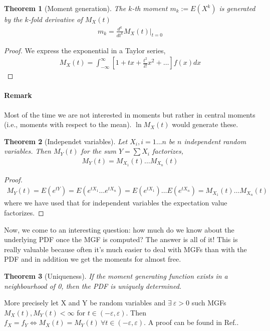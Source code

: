 \documentclass[10pt,a4paper]{article}
\newtheorem{theorem}{Theorem}
\begin{document}
\begin{theorem}[Moment generation]
The $k$-th moment $m_k:=E(X^k)$ is generated by the $k$-fold derivative of $M_X(t)$
\begin{align}
m_k = \frac{d^k}{dt^k} M_X(t)  \bigg \rvert_{t=0}
\end{align}
\end{theorem}
\begin{proof}
We express the exponential in a Taylor series,
\begin{align}
M_X(t) = \int_{-\infty}^{\infty} \left[ 1+ tx + \frac{t^2}{2!}x^2 + \dots   \right] f(x) dx 
\end{align}
\end{proof}

\paragraph*{Remark} Most of the time we are not interested in moments but rather in central moments (i.e., moments with respect to the mean). $\ln M_X(t)$ would generate these.

\begin{theorem}[Independet variables] Let $X_i, i=1\dots n$ be $n$ independent random variables. Then $M_Y(t)$ for the sum $Y = \sum X_i$ factorizes,
\begin{align}
M_Y(t) = M_{X_1}(t) \dots M_{X_n}(t)
\end{align}
\end{theorem}
\begin {proof}
\begin{align*}
M_Y(t) = E(e^{tY}) =  E(e^{tX_1}\dots e^{tX_n}) = E(e^{tX_1})\dots E(e^{tX_n}) =  M_{X_1}(t) \dots M_{X_n}(t)
\end{align*}
where we have used that for independent variables the expectation value factorizes.
\end {proof}

Now, we come to an interesting question: how much do we know about the underlying PDF once the MGF is computed? The answer is all of it!  This is really valuable because often it's much easier to deal with MGFs than with the PDF and in addition we get the moments for almost free.
\begin{theorem}[Uniqueness]
If the moment generating function exists in a neighbourhood of 0, then the PDF is uniquely determined.
\end{theorem}
More precisely let X and Y be random variables and $\exists ~ \varepsilon > 0 $ such MGFs $M_X(t), M_Y(t) < \infty$ for $t \in (-\varepsilon, \varepsilon)$. Then $f_X=f_Y \Leftrightarrow M_X(t) = M_Y(t) ~ \forall t \in (-\varepsilon, \varepsilon)$. A proof can be found in Ref.\cite{curtiss1942}.
\end{document}

